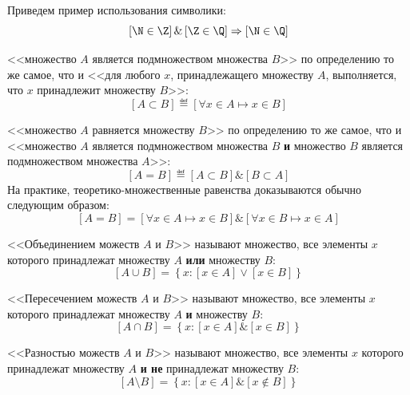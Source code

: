 \begin{example}
Приведем пример использования символики:
\[
    \left[\N \in \Z\right] \& \left[\Z \in \Q\right] \Rightarrow \left[\N \in \Q\right]
\]
\end{example}


\begin{example}
<<множество \(A\) является подмножеством множества \(B\)>> по определению то же самое, что
и <<для любого \(x\), принадлежащего множеству \(A\), выполняется, что \(x\) принадлежит
множеству \(B\)>>:
\[
    \left[A \subset B\right] \eqdef \left[\forall x \in A \mapsto x \in B\right]   
\]
\end{example}

\begin{example}
<<множество \(A\) равняется множеству \(B\)>> по определению то же самое, что и
<<множество \(A\) является подмножеством множества \(B\) \textbf{и}
множество \(B\) является подмножеством множества \(A\)>>:
\[
    \left[A = B\right] \eqdef \left[A \subset B\right] \& \left[B \subset A\right]
\]
На практике, теоретико-множественные равенства доказываются обычно следующим образом:
\[
    \left[A = B\right] = \left[\forall x \in A \mapsto x \in B\right] \&
    \left[\forall x \in B \mapsto x \in A\right]
\]
\end{example}

\begin{example}
<<Объединением можеств \(A\) и \(B\)>> называют множество, все элементы \(x\) которого
принадлежат множеству \(A\) \textbf{или} множеству \(B\):
\[
    \left[A \cup B\right] = \left\{x \colon \left[x \in A\right] \lor \left[x \in B\right]\right\}
\]
\end{example}

\begin{example}
<<Пересечением можеств \(A\) и \(B\)>> называют множество, все элементы \(x\) которого
принадлежат множеству \(A\) \textbf{и} множеству \(B\):
\[
    \left[A \cap B\right] = \left\{x \colon \left[x \in A\right] \& \left[x \in B\right]\right\}
\]
\end{example}

\begin{example}
<<Разностью можеств \(A\) и \(B\)>> называют множество, все элементы \(x\) которого
принадлежат множеству \(A\) \textbf{и не} принадлежат множеству \(B\):
\[
    \left[A \setminus B\right] = \left\{x \colon \left[x \in A\right] \&
    \left[x \not\in B\right]\right\}
\]
\end{example}

